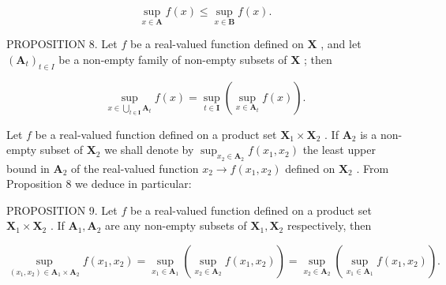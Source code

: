 \[
\sup _ {x \in \mathbf {A}} f (x) \leqslant \sup _ {x \in \mathbf {B}} f (x).\tag{6}
\]

PROPOSITION 8. Let \(f\) be a real-valued function defined on \(\mathbf{X}\) , and let \((\mathbf{A}_t)_{t \in I}\) be a non-empty family of non-empty subsets of \(\mathbf{X}\) ; then

\[
\sup_{x\in \bigcup_{t\in \mathbf{I}}\mathbf{A}_{t}}f(x) = \sup_{t\in \mathbf{I}}(\sup_{x\in \mathbf{A}_{t}}f(x)).\tag{7}
\]

Let \(f\) be a real-valued function defined on a product set \(\mathbf{X}_1 \times \mathbf{X}_2\) . If \(\mathbf{A}_2\) is a non-empty subset of \(\mathbf{X}_2\) we shall denote by \(\sup_{x_2 \in \mathbf{A}_2} f(x_1, x_2)\) the least upper bound in \(\mathbf{A}_2\) of the real-valued function \(x_2 \to f(x_1, x_2)\) defined on \(\mathbf{X}_2\) . From Proposition 8 we deduce in particular:

PROPOSITION 9. Let \(f\) be a real-valued function defined on a product set \(\mathbf{X}_1 \times \mathbf{X}_2\) . If \(\mathbf{A}_1, \mathbf{A}_2\) are any non-empty subsets of \(\mathbf{X}_1, \mathbf{X}_2\) respectively, then

\[
\sup _ {(x _ {1}, x _ {2}) \in \mathbf {A} _ {1} \times \mathbf {A} _ {2}} f (x _ {1}, x _ {2}) = \sup _ {x _ {1} \in \mathbf {A} _ {1}} (\sup _ {x _ {2} \in \mathbf {A} _ {2}} f (x _ {1}, x _ {2})) = \sup _ {x _ {2} \in \mathbf {A} _ {2}} (\sup _ {x _ {1} \in \mathbf {A} _ {1}} f (x _ {1}, x _ {2})).\tag{8}
\]

